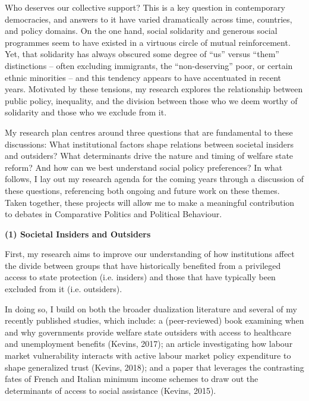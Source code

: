\documentclass[letterpaper]{scrartcl}
\begin{document}
  \raggedbottom

  Who deserves our collective support? This is a key question in contemporary democracies, and answers to it have varied dramatically across time, countries, and policy domains. On the one hand, social solidarity and generous social programmes seem to have existed in a virtuous circle of mutual reinforcement. Yet, that solidarity has always obscured some degree of ``us'' versus ``them'' distinctions -- often excluding immigrants, the ``non-deserving'' poor, or certain ethnic minorities -- and this tendency appears to have accentuated in recent years. Motivated by these tensions, my research explores the relationship between public policy, inequality, and the division between those who we deem worthy of solidarity and those who we exclude from it.

  My research plan centres around three questions that are fundamental to these discussions: What institutional factors shape relations between societal insiders and outsiders? What determinants drive the nature and timing of welfare state reform? And how can we best understand social policy preferences? In what follows, I lay out my research agenda for the coming years through a discussion of these questions, referencing both ongoing and future work on these themes. Taken together, these projects will allow me to make a meaningful contribution to debates in Comparative Politics and Political Behaviour.

  \textbf{(1) Societal Insiders and Outsiders}
  \vspace{-1em}

  First, my research aims to improve our understanding of how institutions affect the divide between groups that have historically benefited from a privileged access to state protection (i.e. insiders) and those that have typically been excluded from it (i.e. outsiders).

  In doing so, I build on both the broader dualization literature and several of my recently published studies, which include: a (peer-reviewed) book examining when and why governments provide welfare state outsiders with access to healthcare and unemployment benefits (Kevins, 2017); an article investigating how labour market vulnerability interacts with active labour market policy expenditure to shape generalized trust (Kevins, 2018); and a paper that leverages the contrasting fates of French and Italian minimum income schemes to draw out the determinants of access to social assistance (Kevins, 2015).
\end{document}
